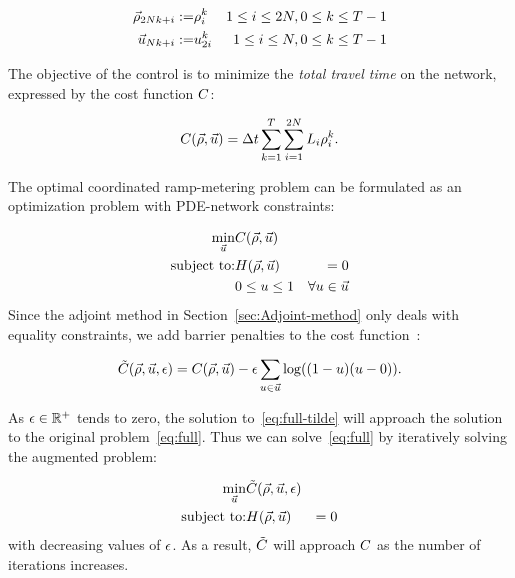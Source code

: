 							\begin{eqnarray*}
								\vec{\rho}_{2Nk+i}:= & \rho_{i}^{k} & 1\le i\le2N,0\le k\le T-1\\
								\vec{u}_{Nk+i}:= & u_{2i}^{k} & 1\le i\le N,0\le k\le T-1
							\end{eqnarray*}
														
														
							The objective of the control is to minimize the \emph{total travel
								time }on the network, expressed by the cost function $C$:
														
							\[
								\cost\left(\state,\control\right)=\Delta t\sum_{k=1}^{T}\sum_{i=1}^{2\nlinks}L_{i}\densitydiscrete{\link}{\tind}.
							\]
														
														
							The optimal coordinated ramp-metering problem can be formulated as
							an optimization problem with PDE-network constraints:
														
							\begin{eqnarray}
								\min_{\control} & \cost\left(\state,\control\right)\label{eq:full}\\
								\text{subject to:} & \sys\left(\state,\control\right) & =0\nonumber \\
								& 0\le\convar\le1 & \forall\convar\in\control\nonumber 
							\end{eqnarray}
							Since the adjoint method in Section~\ref{sec:Adjoint-method} only
							deals with equality constraints, we add barrier penalties to the cost
							function~\cite{Boyd2010,Bayen2006}:
														
							\begin{equation}
								\tilde{\cost}\left(\state,\control,\epsilon\right)=\cost\left(\state,\control\right)-\barrierTerm\sum_{\convar\in\control}\log\left(\left(1-\convar\right)\left(\convar-0\right)\right)\label{eq:full-tilde}.
							\end{equation}
														
														
							As $\epsilon\in\mathbb{R}^{+}$ tends to zero, the solution to~\eqref{eq:full-tilde}
							will approach the solution to the original problem~\eqref{eq:full}.
							Thus we can solve~\eqref{eq:full} by iteratively solving the augmented
							problem:
														
							\begin{eqnarray}
								\min_{\control} & \tilde{\cost}\left(\state,\control,\epsilon\right)\label{eq:full-1}\\
								\text{subject to:} & \sys\left(\state,\control\right) & =0\nonumber 
							\end{eqnarray}
with decreasing values of $\epsilon$. As a result, $\tilde{C}$
							will approach $C$ as the number of iterations increases.
														
